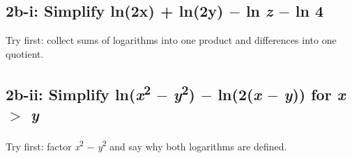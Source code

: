 \documentclass[11pt]{article}
\begin{document}
\begin{keepsection}
\begin{keepsection}
\end{keepsection}

\begin{keepsection}
\subsection{2b-i: Simplify ln(2x) + ln(2y) \ensuremath{-} ln \textit{z} \ensuremath{-} ln 4}

Try first: collect sums of logarithms into one product and differences into one quotient.

\end{keepsection}

\begin{keepsection}
\subsection{2b-ii: Simplify ln(\textit{x}\textsuperscript{2} \ensuremath{-} \textit{y}\textsuperscript{2}) \ensuremath{-} ln(2(\textit{x} \ensuremath{-} \textit{y})) for \textit{x} \ensuremath{>} \textit{y}}

Try first: factor \textit{x}\textsuperscript{2} \ensuremath{-} \textit{y}\textsuperscript{2} and say why both logarithms are defined.

\end{keepsection}
\end{keepsection}
\end{document}
